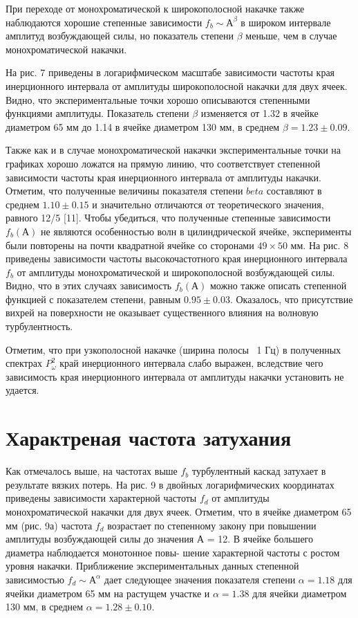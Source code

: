 При переходе от монохроматической к широкополосной накачке также наблюдаются хорошие степенные зависимости $f_b \sim А^\beta$ в широком интервале амплитуд возбуждающей силы, но показатель степени $\beta$ меньше, чем в случае монохроматической накачки.

На рис. 7 приведены в логарифмическом масштабе зависимости частоты края инерционного интервала от амплитуды широкополосной накачки для двух ячеек. Видно, что экспериментальные точки хорошо описываются степенными функциями амплитуды. Показатель степени $\beta$ изменяется от 1.32 в ячейке диаметром 65 мм до 1.14 в ячейке диаметром 130 мм, в среднем $\beta = 1.23 \pm 0.09$.

Также как и в случае монохроматической накачки экспериментальные точки на графиках хорошо ложатся на прямую линию, что соответствует степенной зависимости частоты края инерционного интервала от амплитуды накачки. Отметим, что полученные величины показателя степени $beta$ составляют в среднем $1.10 \pm 0.15$ и значительно отличаются от теоретического значения, равного 12/5 [11].
Чтобы убедиться, что полученные степенные зависимости $f_b(А)$ не являются особенностью волн в цилиндрической 
ячейке, эксперименты были повторены на почти квадратной ячейке со сторонами $49 \times 50$ мм. На рис. 8 приведены зависимости частоты высокочастотного края инерционного интервала $f_b$ от амплитуды монохроматической и широкополосной возбуждающей силы. Видно, что в этих случаях зависимость $f_b(А)$ можно также описать степенной функцией с показателем степени, равным $0.95 \pm 0.03$. Оказалось, что присутствие вихрей на поверхности не оказывает существенного влияния на волновую турбулентность.

Отметим, что при узкополосной накачке (ширина полосы ~1 Гц) в полученных спектрах $P^2_\omega$ край инерционного интервала слабо выражен, вследствие чего зависимость края инерционного интервала от амплитуды накачки установить не удается.

\section{Характреная частота затухания} \label{sect2_3}
Как отмечалось выше, на частотах выше $f_b$ турбулентный каскад затухает в результате вязких потерь. На рис. 9 в двойных логарифмических координатах приведены зависимости характерной частоты $f_d$ от амплитуды монохроматической накачки для двух ячеек. Отметим, что в ячейке диаметром 65 мм (рис. 9а) частота $f_d$ возрастает по степенному закону при повышении амплитуды возбуждающей силы до значения А = 12. В ячейке большего диаметра наблюдается монотонное повы- шение характерной частоты с ростом уровня накачки. Приближение экспериментальных данных степенной зависимостью $f_d \sim А^\alpha$ дает следующее значения показателя степени $\alpha = 1.18$ для ячейки диаметром 65 мм на растущем участке и $\alpha = 1.38$ для ячейки диаметром 130 мм, в среднем $\alpha = 1.28 \pm 0.10$.

